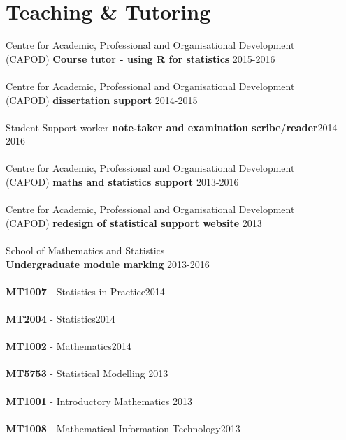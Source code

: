 \documentclass[10pt,letter]{article}
\begin{document}
 
\newpage
 \vspace{-2mm}
 \section*{Teaching \& Tutoring}
 \vspace{1mm}
 
 Centre for Academic, Professional and Organisational Development\\ (CAPOD) \textbf{Course tutor - using R for statistics} \hfill{2015-2016}\\
 \hdashrule[0.5ex]{4cm}{1pt}{1pt}\\
 Centre for Academic, Professional and Organisational Development\\ (CAPOD) \textbf{dissertation support} \hfill{2014-2015}\\
 \hdashrule[0.5ex]{4cm}{1pt}{1pt}\\
Student Support worker \textbf{note-taker and examination scribe/reader}\hfill {2014-2016}\\
 \hdashrule[0.5ex]{4cm}{1pt}{1pt}\\
  Centre for Academic, Professional and Organisational Development\\ (CAPOD) \textbf{maths and statistics support} \hfill{2013-2016}\\
 \hdashrule[0.5ex]{4cm}{1pt}{1pt}\\
 Centre for Academic, Professional and Organisational Development\\ (CAPOD) \textbf{redesign of statistical support website} \hfill{2013}\\
 \hdashrule[0.5ex]{4cm}{1pt}{1pt}\\
School of Mathematics and Statistics\\ \textbf{Undergraduate module marking} \hfill{2013-2016}\\
 \hdashrule[0.5ex]{4cm}{1pt}{1pt}\\
\textbf{MT1007} -  Statistics in Practice\hfill{2014}\\
 \hdashrule[0.5ex]{4cm}{1pt}{1pt}\\
  \textbf{MT2004} -  Statistics\hfill{2014}\\
 \hdashrule[0.5ex]{4cm}{1pt}{1pt}\\
  \textbf{MT1002} -  Mathematics\hfill{2014}\\
 \hdashrule[0.5ex]{4cm}{1pt}{1pt}\\
 \textbf{MT5753} -  Statistical Modelling \hfill{2013}\\
 \hdashrule[0.5ex]{4cm}{1pt}{1pt}\\
\textbf{MT1001} -  Introductory Mathematics \hfill{2013}\\
 \hdashrule[0.5ex]{4cm}{1pt}{1pt}\\
  \textbf{MT1008} -  Mathematical Information Technology\hfill{2013}\\
  
\end{document}
